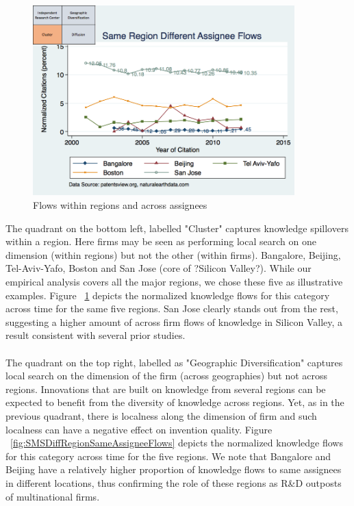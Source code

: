 \documentclass[10pt,letterpaper]{article}
\begin{document}
\begin{figure}[h!]
\begin{centering}
  \includegraphics[width=0.90\textwidth]{SMSSameRegionDiffAssigneeFlows}
  \caption{Flows within regions and across assignees}
  \label{fig:SMSSameRegionDiffAssigneeFlows}
\end{centering}
\end{figure}
The quadrant on the bottom left, labelled "Cluster" captures knowledge spillovers within a region. Here firms may be seen as performing local search on one dimension (within regions) but not the other (within firms). Bangalore, Beijing, Tel-Aviv-Yafo, Boston and San Jose (core of ?Silicon Valley?). While our empirical analysis covers all the major regions, we chose these five as illustrative examples. Figure ~\ref{fig:SMSSameRegionDiffAssigneeFlows} depicts the normalized knowledge flows for this category across time for the same five regions. San Jose clearly stands out from the rest, suggesting a higher amount of across firm flows of knowledge in Silicon Valley, a result consistent with several prior studies.
\\\\
The quadrant on the top right, labelled as "Geographic Diversification" captures local search on the dimension of the firm (across geographies) but not across regions. Innovations that are built on knowledge from several regions can be expected to benefit from the diversity of knowledge across regions. Yet, as in the previous quadrant, there is localness along the dimension of firm and such localness can have a negative effect on invention quality. Figure ~\ref{fig:SMSDiffRegionSameAssigneeFlows} depicts the normalized knowledge flows for this category across time for the five regions. We note that Bangalore and Beijing have a relatively higher proportion of knowledge flows to same assignees in different locations, thus confirming the role of these regions as R\&D outposts of multinational firms.
\end{document}

